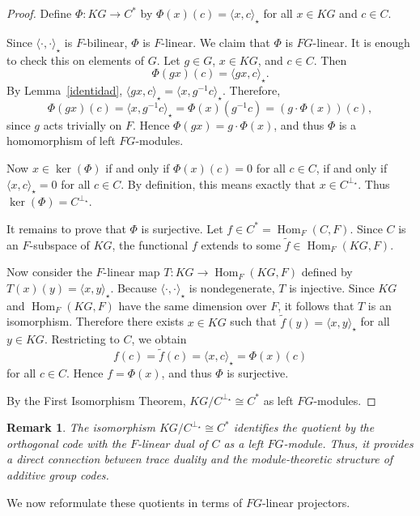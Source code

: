 \documentclass[11pt]{article}
\newtheorem{remark}[theorem]{Remark}
\begin{document}
\begin{proof}
Define $\Phi:KG\longrightarrow C^*$ by $\Phi(x)(c)=\langle x,c\rangle_\star$ for all $x\in KG$ and $c\in C$.

Since $\langle\cdot,\cdot\rangle_\star$ is $F$-bilinear, $\Phi$ is $F$-linear. We claim that $\Phi$ is $FG$-linear. It is enough to check this on elements of $G$. Let $g\in G$, $x\in KG$, and $c\in C$. Then
$$
\Phi(gx)(c)=\langle gx,c\rangle_\star.
$$
By Lemma~\ref{identidad}, $\langle gx,c\rangle_\star=\langle x,g^{-1}c\rangle_\star$. Therefore,
$$
\Phi(gx)(c)=\langle x,g^{-1}c\rangle_\star=\Phi(x)(g^{-1}c)=(g\cdot\Phi(x))(c),
$$
since $g$ acts trivially on $F$. Hence $\Phi(gx)=g\cdot\Phi(x)$, and thus $\Phi$ is a homomorphism of left $FG$-modules.

Now $x\in\ker(\Phi)$ if and only if $\Phi(x)(c)=0$ for all $c\in C$, if and only if $\langle x,c\rangle_\star=0$ for all $c\in C$. By definition, this means exactly that $x\in C^{\perp_\star}$. Thus $\ker(\Phi)=C^{\perp_\star}$.

It remains to prove that $\Phi$ is surjective. Let $f\in C^*=\operatorname{Hom}_F(C,F)$. Since $C$ is an $F$-subspace of $KG$, the functional $f$ extends to some $\widetilde{f}\in \operatorname{Hom}_F(KG,F)$.

Now consider the $F$-linear map
$
T:KG\longrightarrow \operatorname{Hom}_F(KG,F)$ defined by $T(x)(y)=\langle x,y\rangle_\star.
$
Because $\langle\cdot,\cdot\rangle_\star$ is nondegenerate, $T$ is injective. Since $KG$ and $\operatorname{Hom}_F(KG,F)$ have the same dimension over $F$, it follows that $T$ is an isomorphism. Therefore there exists $x\in KG$ such that
$
\widetilde{f}(y)=\langle x,y\rangle_\star
$
for all $y\in KG$. Restricting to $C$, we obtain
$$
f(c)=\widetilde{f}(c)=\langle x,c\rangle_\star=\Phi(x)(c)
$$
for all $c\in C$. Hence $f=\Phi(x)$, and thus $\Phi$ is surjective.

By the First Isomorphism Theorem, $KG/C^{\perp_\star}\cong C^*$ as left $FG$-modules.
\end{proof}

\begin{remark}\label{rem:quotient-module-dual-significance}
The isomorphism $KG/C^{\perp_\star}\cong C^*$ identifies the quotient by the
orthogonal code with the $F$-linear dual of $C$ as a left $FG$-module. Thus,
it provides a direct connection between trace duality and the
module-theoretic structure of additive group codes.
\end{remark}

We now reformulate these quotients in terms of $FG$-linear projectors.
\end{document}
